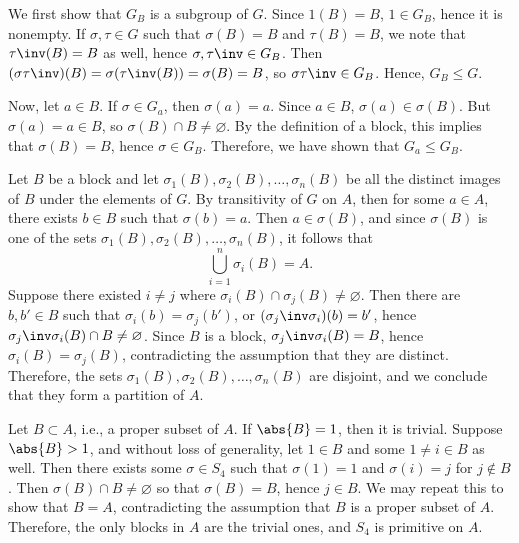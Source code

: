 \begin{solenum}
	\item We first show that $G_B$ is a subgroup of $G$.
	Since $1(B) = B$, $1 \in G_B$, hence it is nonempty.
	If $\sigma, \tau \in G$ such that $\sigma(B) = B$ and $\tau(B) = B$, we note that $\tau\inv(B) = B$ as well, hence $\sigma, \tau\inv \in G_B$.
	Then $(\sigma\tau\inv)(B) = \sigma(\tau\inv(B)) = \sigma(B) = B$, so $\sigma\tau\inv \in G_B$.
	Hence, $G_B \leq G$.
	
	Now, let $a \in B$.
	If $\sigma \in G_a$, then $\sigma(a) = a$.
	Since $a \in B$, $\sigma(a) \in \sigma(B)$.
	But $\sigma(a) = a \in B$, so $\sigma(B) \cap B \neq \varnothing$.
	By the definition of a block, this implies that $\sigma(B) = B$, hence $\sigma \in G_B$.
	Therefore, we have shown that $G_a \leq G_B$.
	\item Let $B$ be a block and let $\sigma_1(B), \sigma_2(B), \ldots, \sigma_n(B)$ be all the distinct images of $B$ under the elements of $G$.
	By transitivity of $G$ on $A$, then for some $a \in A$, there exists $b \in B$ such that $\sigma(b) = a$.
	Then $a \in \sigma(B)$, and since $\sigma(B)$ is one of the sets $\sigma_1(B), \sigma_2(B), \ldots, \sigma_n(B)$, it follows that
	\[
		\bigcup_{i=1}^n \sigma_i(B) = A.
	\]
	Suppose there existed $i \neq j$ where $\sigma_i(B) \cap \sigma_j(B) \neq \varnothing$.
	Then there are $b, b' \in B$ such that $\sigma_i(b) = \sigma_j(b')$, or $(\sigma_j\inv\sigma_i)(b) = b'$, hence $\sigma_j\inv\sigma_i(B) \cap B \neq \varnothing$.
	Since $B$ is a block, $\sigma_j\inv\sigma_i(B) = B$, hence $\sigma_i(B) = \sigma_j(B)$, contradicting the assumption that they are distinct.
	Therefore, the sets $\sigma_1(B), \sigma_2(B), \ldots, \sigma_n(B)$ are disjoint, and we conclude that they form a partition of $A$.
	\item Let $B \subset A$, i.e., a proper subset of $A$.
	If $\abs{B} = 1$, then it is trivial.
	Suppose $\abs{B} > 1$, and without loss of generality, let $1 \in B$ and some $1 \neq i \in B$ as well.
	Then there exists some $\sigma \in S_4$ such that $\sigma(1) = 1$ and $\sigma(i) = j$ for $j \notin B$.
	Then $\sigma(B) \cap B \neq \varnothing$ so that $\sigma(B) = B$, hence $j \in B$.
	We may repeat this to show that $B = A$, contradicting the assumption that $B$ is a proper subset of $A$.
	Therefore, the only blocks in $A$ are the trivial ones, and $S_4$ is primitive on $A$.
	

\end{solenum}

